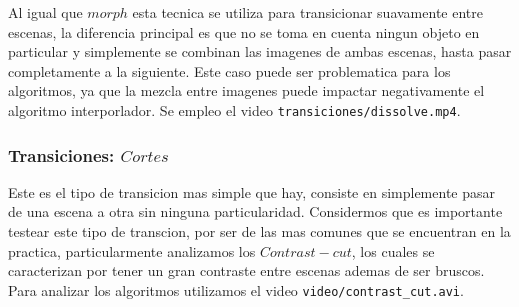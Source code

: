 Al igual que $morph$ esta tecnica se utiliza para transicionar suavamente entre escenas, la diferencia principal es que no se toma en cuenta ningun objeto en particular y simplemente se combinan las imagenes de ambas escenas, hasta pasar completamente a la siguiente. Este caso puede ser problematica para los algoritmos, ya que la mezcla entre imagenes puede impactar negativamente el algoritmo interporlador. Se empleo el video \texttt{transiciones/dissolve.mp4}.

\subsubsection{Transiciones: $Cortes$}

Este es el tipo de transicion mas simple que hay, consiste en simplemente pasar de una escena a otra sin ninguna particularidad. Considermos que es importante testear este tipo de transcion, por ser de las mas comunes que se encuentran en la practica, particularmente analizamos los $Contrast-cut$, los cuales se caracterizan por tener un gran contraste entre escenas ademas de ser bruscos. Para analizar los algoritmos utilizamos el video \texttt{video/contrast\_cut.avi}.